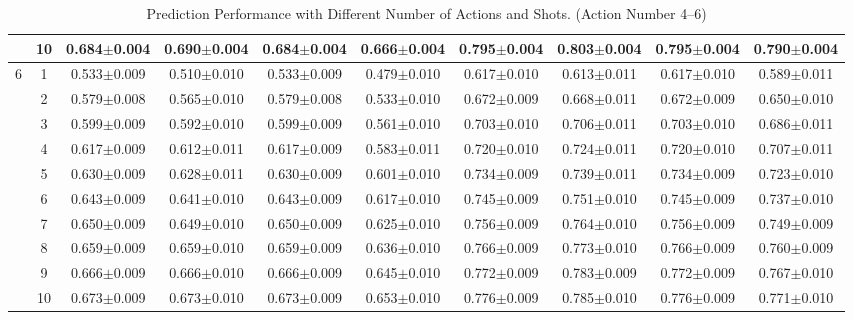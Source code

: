 \begin{table}[htbp]
{\begin{tabular}[]{c|c|cccc|cccc}
  & 10 & 0.684{\tiny$\pm$0.004} & 0.690{\tiny$\pm$0.004} & 0.684{\tiny$\pm$0.004} & 0.666{\tiny$\pm$0.004} & 0.795{\tiny$\pm$0.004} & 0.803{\tiny$\pm$0.004} & 0.795{\tiny$\pm$0.004} & 0.790{\tiny$\pm$0.004} \\
\midrule
\multirow{10}{*}{6} 
  & 1  & 0.533{\tiny$\pm$0.009} & 0.510{\tiny$\pm$0.010} & 0.533{\tiny$\pm$0.009} & 0.479{\tiny$\pm$0.010} & 0.617{\tiny$\pm$0.010} & 0.613{\tiny$\pm$0.011} & 0.617{\tiny$\pm$0.010} & 0.589{\tiny$\pm$0.011} \\
  & 2  & 0.579{\tiny$\pm$0.008} & 0.565{\tiny$\pm$0.010} & 0.579{\tiny$\pm$0.008} & 0.533{\tiny$\pm$0.010} & 0.672{\tiny$\pm$0.009} & 0.668{\tiny$\pm$0.011} & 0.672{\tiny$\pm$0.009} & 0.650{\tiny$\pm$0.010} \\
  & 3  & 0.599{\tiny$\pm$0.009} & 0.592{\tiny$\pm$0.010} & 0.599{\tiny$\pm$0.009} & 0.561{\tiny$\pm$0.010} & 0.703{\tiny$\pm$0.010} & 0.706{\tiny$\pm$0.011} & 0.703{\tiny$\pm$0.010} & 0.686{\tiny$\pm$0.011} \\
  & 4  & 0.617{\tiny$\pm$0.009} & 0.612{\tiny$\pm$0.011} & 0.617{\tiny$\pm$0.009} & 0.583{\tiny$\pm$0.011} & 0.720{\tiny$\pm$0.010} & 0.724{\tiny$\pm$0.011} & 0.720{\tiny$\pm$0.010} & 0.707{\tiny$\pm$0.011} \\
  & 5  & 0.630{\tiny$\pm$0.009} & 0.628{\tiny$\pm$0.011} & 0.630{\tiny$\pm$0.009} & 0.601{\tiny$\pm$0.010} & 0.734{\tiny$\pm$0.009} & 0.739{\tiny$\pm$0.011} & 0.734{\tiny$\pm$0.009} & 0.723{\tiny$\pm$0.010} \\
  & 6  & 0.643{\tiny$\pm$0.009} & 0.641{\tiny$\pm$0.010} & 0.643{\tiny$\pm$0.009} & 0.617{\tiny$\pm$0.010} & 0.745{\tiny$\pm$0.009} & 0.751{\tiny$\pm$0.010} & 0.745{\tiny$\pm$0.009} & 0.737{\tiny$\pm$0.010} \\
  & 7  & 0.650{\tiny$\pm$0.009} & 0.649{\tiny$\pm$0.010} & 0.650{\tiny$\pm$0.009} & 0.625{\tiny$\pm$0.010} & 0.756{\tiny$\pm$0.009} & 0.764{\tiny$\pm$0.010} & 0.756{\tiny$\pm$0.009} & 0.749{\tiny$\pm$0.009} \\
  & 8  & 0.659{\tiny$\pm$0.009} & 0.659{\tiny$\pm$0.010} & 0.659{\tiny$\pm$0.009} & 0.636{\tiny$\pm$0.010} & 0.766{\tiny$\pm$0.009} & 0.773{\tiny$\pm$0.010} & 0.766{\tiny$\pm$0.009} & 0.760{\tiny$\pm$0.009} \\
  & 9  & 0.666{\tiny$\pm$0.009} & 0.666{\tiny$\pm$0.010} & 0.666{\tiny$\pm$0.009} & 0.645{\tiny$\pm$0.010} & 0.772{\tiny$\pm$0.009} & 0.783{\tiny$\pm$0.009} & 0.772{\tiny$\pm$0.009} & 0.767{\tiny$\pm$0.010} \\
  & 10 & 0.673{\tiny$\pm$0.009} & 0.673{\tiny$\pm$0.010} & 0.673{\tiny$\pm$0.009} & 0.653{\tiny$\pm$0.010} & 0.776{\tiny$\pm$0.009} & 0.785{\tiny$\pm$0.010} & 0.776{\tiny$\pm$0.009} & 0.771{\tiny$\pm$0.010} \\
\bottomrule
\end{tabular}
}
\caption{Prediction Performance with Different Number of Actions and Shots. (Action Number 4--6)}
\end{table}
